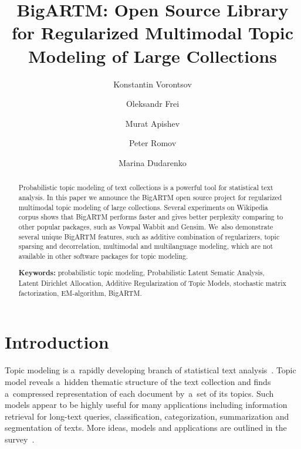 \documentclass[russian]{llncs}
\begin{document}
\title{
    BigARTM: Open Source Library for
    Regularized Multimodal %
    Topic Modeling of Large Collections
}
\author{
    Konstantin Vorontsov
    \and
    Oleksandr Frei
    \and
    Murat Apishev
    \and
    Peter Romov
    \and
    Marina Dudarenko
}

\maketitle

\begin{abstract}
Probabilistic topic modeling of text collections is a powerful tool for statistical text analysis.
In this paper we announce the \mbox{BigARTM} open source project
for regularized multimodal topic modeling of large collections.
Several experiments on Wikipedia corpus shows that BigARTM performs faster and gives better perplexity
comparing to other popular packages, such as Vowpal Wabbit and Gensim.
We~also demonstrate several unique BigARTM features, such as
additive combination of regularizers,
topic sparsing and decorrelation,
multimodal and multilanguage modeling,
which are not available in other software packages for topic modeling.

\vspace{1em}
\textbf{Keywords:}
    probabilistic topic modeling,
    Probabilistic Latent Sematic Analysis,
    Latent Dirichlet Allocation,
    Additive Regularization of Topic Models,
    stochastic matrix factorization,
    EM-algorithm,
    BigARTM.
\end{abstract}

\section{Introduction}

Topic modeling is a~rapidly developing branch of statistical text analysis~\cite{blei12ptm}.
Topic model reveals a~hidden thematic structure of the text collection
and finds a~compressed representation of each document by~a~set of its topics.
Such models appear to be highly useful for many applications including
information retrieval for long-text queries,
classification, categorization, summarization and segmentation of texts.
More ideas, models and applications are outlined in the survey~\cite{daud10knowledge}.
\end{document}
